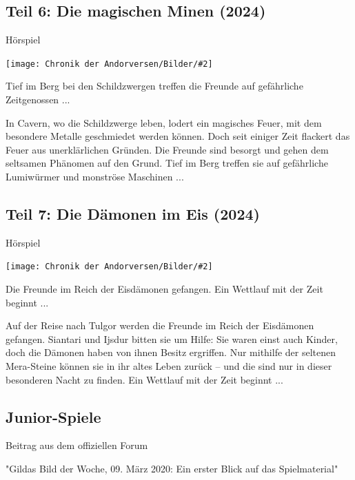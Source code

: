 \documentclass[10pt, a4paper, oneside]{book}
\newcommand{\fillbreak}{\vspace*{\fill}\columnbreak}
\newcommand{\produkt}[1]{%
    \section{#1}%
    \label{Produkt: #1}%
}
\newcommand{\bildmitts}[2][height=0.32\textwidth,width=0.48\textwidth,keepaspectratio]{%
    \begin{center}
        \texttt{[image: Chronik der Andorversen/Bilder/\#2]}
    \end{center}
}
\begin{document}
\begin{multicols}{2}
\fillbreak
\produkt{Teil 6: Die magischen Minen (2024)}

\begin{center}
    Hörspiel
\end{center}

\bildmitts{Die magischen Minen (2024).jpeg}


Tief im Berg bei den Schildzwergen treffen die Freunde auf gefährliche Zeitgenossen ...

In Cavern, wo die Schildzwerge leben, lodert ein magisches Feuer, mit dem besondere Metalle geschmiedet werden können. Doch seit einiger Zeit flackert das Feuer aus unerklärlichen Gründen. Die Freunde sind besorgt und gehen dem seltsamen Phänomen auf den Grund. Tief im Berg treffen sie auf gefährliche Lumiwürmer und monströse Maschinen ...



\produkt{Teil 7: Die Dämonen im Eis (2024)}

\begin{center}
    Hörspiel
\end{center}

\bildmitts{Die Dämonen im Eis (2024).jpeg}

Die Freunde im Reich der Eisdämonen gefangen. Ein Wettlauf mit der Zeit beginnt ...

Auf der Reise nach Tulgor werden die Freunde im Reich der Eisdämonen gefangen. Siantari und Ijsdur bitten sie um Hilfe: Sie waren einst auch Kinder, doch die Dämonen haben von ihnen Besitz ergriffen. Nur mithilfe der seltenen Mera-Steine können sie in ihr altes Leben zurück – und die sind nur in dieser besonderen Nacht zu finden. Ein Wettlauf mit der Zeit beginnt ...














\begin{chapterbox}

    \chapter{Junior-Spiele}
    
    \begin{center}
        Beitrag aus dem offiziellen Forum

        "Gildas Bild der Woche, 09. März 2020: Ein erster Blick auf das Spielmaterial"
    \end{center}
    

\end{chapterbox}
\end{multicols}
\end{document}
